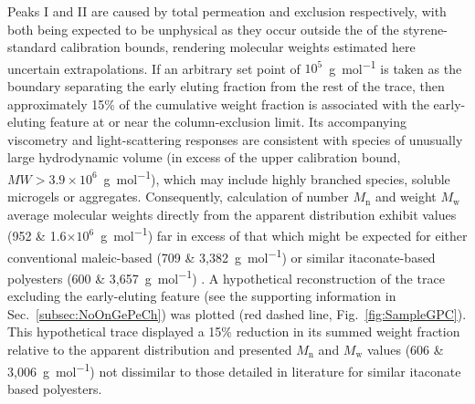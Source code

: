 Peaks I and II are caused by total permeation and exclusion respectively,
 with both being expected to be unphysical as they occur
 outside the of the styrene-standard calibration bounds, rendering
 molecular weights estimated here uncertain extrapolations.
If an arbitrary set point of 
 \(10^{5}\)~\unit{\gram\per\mole} is taken as the boundary separating
 the early eluting fraction from the rest of the trace, then 
 approximately 15\% of the cumulative weight fraction is associated 
 with the early-eluting feature at or near the column-exclusion limit.
Its accompanying viscometry and light-scattering responses are consistent
 with species of unusually large hydrodynamic volume (in excess of the upper
 calibration bound, \(MW>3.9\times10^{6}\)~\unit{\gram\per\mole}), which may 
 include highly branched species, soluble microgels or aggregates.
Consequently, calculation of number \(M_{\text{n}}\) and weight
 \(M_{\text{w}}\) average molecular weights directly from the apparent
 distribution exhibit values 
 (952 \& 1.6\(\times 10^{6}\)~\unit{\gram\per\mole}) far in excess of that 
 which might be expected for either conventional maleic-based
 (709 \& 3,382~\unit{\gram\per\mole}) or similar itaconate-based polyesters
 (600 \& 3,657~\unit{\gram\per\mole}) \autocite{Bamane2020}.
A hypothetical reconstruction of the trace excluding the early-eluting
 feature (see the supporting information in Sec.~\ref{subsec:NoOnGePeCh})
 was plotted (red dashed line, Fig.~\ref{fig:SampleGPC}).
This hypothetical trace displayed a 15\% reduction in its summed weight
 fraction relative to the apparent distribution and presented  
 \(M_{\text{n}}\) and \(M_{\text{w}}\) values (606
 \& 3,006~\unit{\gram\per\mole}) not dissimilar to those detailed in
 literature for similar itaconate based polyesters.

